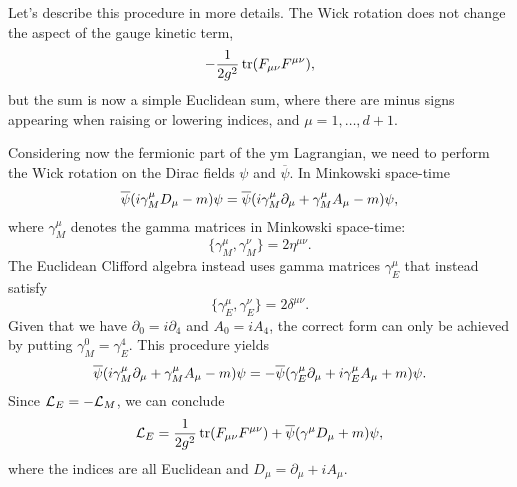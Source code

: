 %
Let's describe this procedure in more details.
The Wick rotation does not change the aspect of the gauge kinetic term,
\begin{equation}
    - \frac{1}{2 g^2} \tr(F_{\mu \nu} F^{\mu \nu}),
\end{equation}
but the sum is now a simple Euclidean sum, where there are minus signs appearing when raising or lowering indices, and $\mu = 1, \dots, d+1$.

Considering now the fermionic part of the \ac{ym} Lagrangian, we need to perform the Wick rotation on the Dirac fields $\psi$ and $\overline{\psi}$.
In Minkowski space-time
\begin{equation}
    \overline{\psi} \qty( i \gamma^{\mu}_M D_{\mu} - m ) \psi
    = \overline{\psi} \qty( i \gamma^{\mu}_M \partial_{\mu} + \gamma^{\mu}_M A_{\mu} - m ) \psi,
\end{equation}
where $\gamma^{\mu}_M$ denotes the gamma matrices in Minkowski space-time:
\begin{equation*}
    \{\gamma^{\mu}_M, \gamma^{\nu}_M\} = 2 \eta^{\mu \nu}.
\end{equation*}
The Euclidean Clifford algebra instead uses gamma matrices $\gamma^{\mu}_E$ that instead satisfy
\begin{equation*}
    \{\gamma^{\mu}_E, \gamma^{\nu}_E\} = 2 \delta^{\mu \nu}.
\end{equation*}
Given that we have $\partial_0 = i \partial_4$ and $A_0 = i A_4$, the correct form can only be achieved by putting $\gamma^0_M = \gamma^4_E$.
This procedure yields
\begin{equation}
    \overline{\psi} \qty( i \gamma^{\mu}_M \partial_{\mu} + \gamma^{\mu}_M A_{\mu} - m ) \psi
    =
    - \overline{\psi} \qty( \gamma^{\mu}_E \partial_{\mu} + i\gamma^{\mu}_E A_{\mu} + m ) \psi.
\end{equation}
Since $\mathcal{L}_E = - \mathcal{L}_M$, we can conclude
\begin{equation}
    \mathcal{L}_E
    = \frac{1}{2 g^2} \tr (F_{\mu \nu} F^{\mu \nu}) + \overline{\psi} \qty( \gamma^{\mu} D_{\mu} + m) \psi,
\end{equation}
where the indices are all Euclidean and $D_{\mu} = \partial_{\mu} + i A_{\mu}$.



